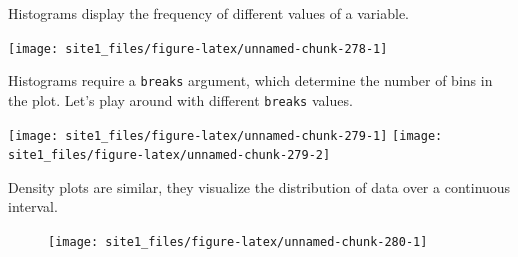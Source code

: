\documentclass[]{book}
\newenvironment{Shaded}{\begin{snugshade}}{\end{snugshade}}
\newcommand{\AlertTok}[1]{\textcolor[rgb]{0.94,0.16,0.16}{#1}}
\newcommand{\CommentTok}[1]{\textcolor[rgb]{0.56,0.35,0.01}{\textit{#1}}}
\newcommand{\DataTypeTok}[1]{\textcolor[rgb]{0.13,0.29,0.53}{#1}}
\newcommand{\DecValTok}[1]{\textcolor[rgb]{0.00,0.00,0.81}{#1}}
\newcommand{\KeywordTok}[1]{\textcolor[rgb]{0.13,0.29,0.53}{\textbf{#1}}}
\newcommand{\NormalTok}[1]{#1}
\newcommand{\OperatorTok}[1]{\textcolor[rgb]{0.81,0.36,0.00}{\textbf{#1}}}
\newcommand{\StringTok}[1]{\textcolor[rgb]{0.31,0.60,0.02}{#1}}
\begin{document}
Histograms display the frequency of different values of a variable.

\begin{Shaded}
\end{Shaded}

\begin{center}\texttt{[image: site1\_files/figure-latex/unnamed-chunk-278-1]} \end{center}

Histograms require a \texttt{breaks} argument, which determine the number of bins in the plot. Let's play around with different \texttt{breaks} values.

\begin{Shaded}
\end{Shaded}

\begin{center}\texttt{[image: site1\_files/figure-latex/unnamed-chunk-279-1]} \texttt{[image: site1\_files/figure-latex/unnamed-chunk-279-2]} \end{center}

Density plots are similar, they visualize the distribution of data over a continuous interval.

\begin{Shaded}
\end{Shaded}

\begin{figure}

{\centering \texttt{[image: site1\_files/figure-latex/unnamed-chunk-280-1]} 

}

\caption{ }\label{fig:unnamed-chunk-280}
\end{figure}
\end{document}
